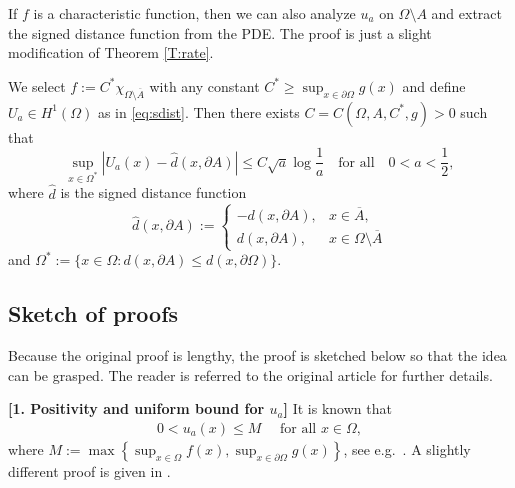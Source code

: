 \documentclass[graybox]{svmult}
\renewcommand{\AA}{A}  %
\begin{document}
If $f$ is a characteristic function, then we can also analyze $u_a$ on $\Omega \setminus \AA$ and extract the signed distance function from the PDE. The proof is just a slight modification of Theorem \ref{T:rate}. 

\begin{theorem}[\cite{M}]
We select $f:= C^* \chi_{\Omega \setminus \overline{\AA}}$ with any constant $C^* \ge \sup_{x\in \partial\Omega}g(x)$ and define  
 $U_a\in H^1(\Omega)$ as in \eqref{eq:sdist}.  Then there exists $C= C(\Omega,\AA,C^*,g)>0$ such that 
\begin{equation*}\label{eq:rate_signed_distance}
\sup_{x \in \Omega^*} |U_a(x) - \hat{d}(x,\partial \AA)| \le C \sqrt{a} \log \frac1{a} \quad\text{for all} \quad 0< a< \frac{1}{2}, 
\end{equation*}
where $\hat{d}$ is the signed distance function 
\begin{equation*}
\hat{d}(x,\partial \AA) := 
\begin{cases}
-d(x,\partial \AA), & x \in \overline{\AA}, \\
d(x, \partial \AA), & x \in \Omega \setminus \overline{\AA} 
\end{cases}
\end{equation*}
and $\Omega^\ast:=\{ x\in \Omega\colon d(x,\partial \AA)\le d(x,\partial\Omega)\}$. 
\end{theorem}




\subsection{Sketch of proofs}

Because the original proof is lengthy, the proof is sketched below so that the idea can be grasped. The reader is referred to the original article \cite{M} for further details. 

\vspace{3mm}
\noindent
\textbf{[1. Positivity and uniform bound for $u_a$]\hspace{2mm}} It is known that
\begin{align}\label{eq:minmax}
0<u_a(x)\le M\quad \text{ for all } x\in \Omega, 
\end{align}
where $M:=\max\left\{\sup_{x\in \Omega} f(x),  \sup_{x\in \partial\Omega} g(x)\right\}$, see e.g.\ \cite[Theorem 9.27 and footnote 34]{B11}. A slightly different proof is given in \cite{M}. 
\end{document}
